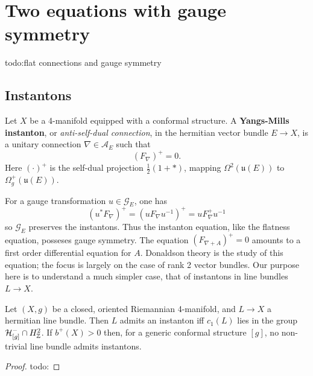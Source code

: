 \section{Two equations with gauge symmetry} 
{\color{red}todo:flat connections and gauge symmetry} 
\subsection{Instantons}
\begin{definition}[]
    Let $X$ be a 4-manifold equipped with a conformal structure. A \textbf{Yangs-Mills instanton}, or \emph{anti-self-dual connection}, in the hermitian vector bundle $E \to X$, is a unitary connection $\nabla \in \mathcal A_E$ such that \[
        \left( F _{\nabla} \right) ^+ = 0. 
    \] Here $\left( \cdot  \right) ^+$ is the self-dual projection $\frac{1}{2}\left( 1+* \right) $, mapping $\Omega^2(\mathfrak u(E))$ to $\Omega^+_g(\mathfrak u(E))$.
\end{definition}
For a gauge transformation $u \in \mathcal G_E$, one has \[
    \left( u^* F_{\nabla} \right) ^+ = (u F_{\nabla}u^{-1})^+ = uF^+ _{\nabla}u^{-1}
\] so $\mathcal G_E$ preserves the instantons. Thus the instanton equation, like the flatness equation, posseses gauge symmetry. The equation $\left( F_{\nabla+A} \right) ^+ = 0$ amounts to a first order differential equation for $A$. Donaldson theory is the study of this equation; the focus is largely on the case of rank 2 vector bundles. Our purpose here is to understand a much simpler case, that of instantons in line bundles $L \to X$.

\begin{theorem}
    Let $(X,g)$ be a closed, oriented Riemannian 4-manifold, and $L \to X$ a hermitian line bundle. Then $L$ admits an instanton iff $c_1(L)$ lies in the group $\mathcal H^- _{[g]}\cap  H^2_{\mathbb{Z}}$. If $b^+ \left(X \right) >0$ then, for a generic conformal structure $[g]$, no non-trivial line bundle admits instantons.
\end{theorem}
\begin{proof}
    {\color{red}todo:} 
\end{proof}

